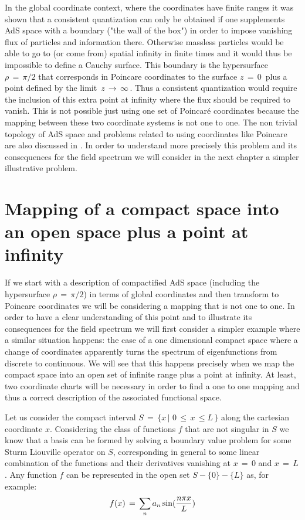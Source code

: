 \documentclass[a4paper,12pt]{article}
\begin{document}
In the global coordinate context, where the coordinates have  
finite ranges it was shown that a consistent quantization 
can only be obtained if  one  supplements AdS space 
with a boundary ("the wall of the box") in order to impose vanishing
flux of particles and  information there\cite{QAdS1,QAdS2}.
Otherwise massless particles would be able to go to (or come from)  
spatial infinity in finite times and it would thus be impossible 
to define a Cauchy surface. 
This boundary is the hypersurface $\rho\,=\,\pi/2$ 
that corresponds in Poincare coordinates  to the surface $z\,=\,0\,$ 
plus a point defined by the limit $\,z\,\rightarrow\,\infty\,$.
Thus a consistent quantization would require the inclusion of
this extra point at infinity where the flux should be required to vanish.
This is not possible just using one set of Poincar\'e coordinates
because the mapping between these two coordinate systems is not one to one.
The non trivial  topology of AdS space and problems related to using 
coordinates like Poincare are also discussed in \cite{McI}.
In order to understand more precisely this 
problem  and its consequences for the field spectrum we will 
consider in the next chapter a simpler illustrative problem.
 

\section{Mapping of a compact space into an open space plus 
a point at infinity}
\label{mapping}

If we start with a description of compactified AdS space 
(including the hypersurface $\rho\,=\,\pi/2$) 
in terms of global coordinates and then transform
to Poincare coordinates we will be  considering  a mapping that is not 
one to one. 
In order to have a clear understanding of this point and to 
illustrate its consequences for the field spectrum we will 
first consider a simpler example where
a similar  situation happens: the case of a 
one dimensional compact space where  a change of coordinates
apparently turns the spectrum of eigenfunctions from 
discrete to continuous.
We will see that this happens precisely when we map 
the compact space into an open set of infinite range plus  a  point 
at infinity. At least, two coordinate charts will be necessary in order 
to find a one to one mapping and thus a correct description of the 
associated functional space.

Let us consider the compact interval 
$S\,=\,\{ x\, \vert \,\, 0 \,\le \,x \,\le L\,\}$ 
along the cartesian coordinate $x$.
Considering the class of functions $f$ that are not 
singular in $S$ we know that a basis can be formed 
 by solving a boundary value problem for some 
 Sturm Liouville operator on $S$, corresponding in general to 
some linear combination of the functions and their derivatives 
vanishing 
at $x\,=\,0 $ and $x\,=\, L\,$. Any function $f $ 
can be represented in the open set $S -\{0\} 
-\{L\}$ as, for example:
\begin{equation}
f(x)\,=\,\sum_n  a_n \sin ({n\pi x\over L}) 
\end{equation}
\end{document}
